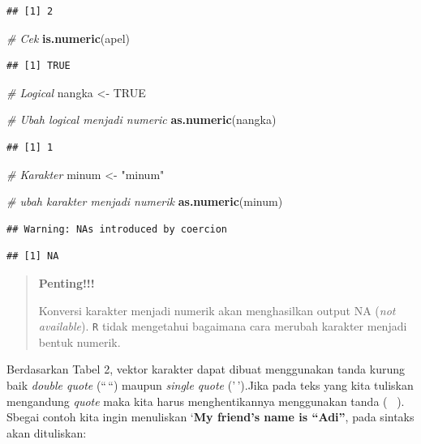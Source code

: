 \documentclass[
]{book}
\newenvironment{Shaded}{\begin{snugshade}}{\end{snugshade}}
\newcommand{\CommentTok}[1]{\textcolor[rgb]{0.56,0.35,0.01}{\textit{#1}}}
\newcommand{\ConstantTok}[1]{\textcolor[rgb]{0.56,0.35,0.01}{#1}}
\newcommand{\FunctionTok}[1]{\textcolor[rgb]{0.13,0.29,0.53}{\textbf{#1}}}
\newcommand{\NormalTok}[1]{#1}
\newcommand{\OtherTok}[1]{\textcolor[rgb]{0.56,0.35,0.01}{#1}}
\newcommand{\StringTok}[1]{\textcolor[rgb]{0.31,0.60,0.02}{#1}}
\theoremstyle{definition}
\theoremstyle{definition}
\theoremstyle{definition}
\theoremstyle{definition}
\theoremstyle{remark}
\begin{document}
\begin{verbatim}
## [1] 2
\end{verbatim}

\begin{Shaded}
\begin{Highlighting}[]
\CommentTok{\# Cek}
\FunctionTok{is.numeric}\NormalTok{(apel)}
\end{Highlighting}
\end{Shaded}

\begin{verbatim}
## [1] TRUE
\end{verbatim}

\begin{Shaded}
\begin{Highlighting}[]
\CommentTok{\# Logical}
\NormalTok{nangka }\OtherTok{\textless{}{-}} \ConstantTok{TRUE}

\CommentTok{\# Ubah logical menjadi numeric}
\FunctionTok{as.numeric}\NormalTok{(nangka)}
\end{Highlighting}
\end{Shaded}

\begin{verbatim}
## [1] 1
\end{verbatim}

\begin{Shaded}
\begin{Highlighting}[]
\CommentTok{\# Karakter}
\NormalTok{minum }\OtherTok{\textless{}{-}} \StringTok{"minum"}

\CommentTok{\# ubah karakter menjadi numerik}
\FunctionTok{as.numeric}\NormalTok{(minum)}
\end{Highlighting}
\end{Shaded}

\begin{verbatim}
## Warning: NAs introduced by coercion
\end{verbatim}

\begin{verbatim}
## [1] NA
\end{verbatim}

\begin{quote}
\textbf{Penting!!!}

Konversi karakter menjadi numerik akan menghasilkan output NA (\emph{not available}). \texttt{R} tidak mengetahui bagaimana cara merubah karakter menjadi bentuk numerik.
\end{quote}

Berdasarkan Tabel 2, vektor karakter dapat dibuat menggunakan tanda kurung baik \emph{double quote} (``\,``) maupun \emph{single quote} ('\,').Jika pada teks yang kita tuliskan mengandung \emph{quote} maka kita harus menghentikannya menggunakan tanda ( ~). Sbegai contoh kita ingin menuliskan `\textbf{My friend's name is ``Adi''}, pada sintaks akan dituliskan:
\end{document}
